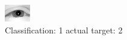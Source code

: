 \begin{figure}[h!]
\begin{center}
\includegraphics[width=0.60\columnwidth]{figures/ID2271_class_1_target_2.png}
\end{center}
\caption{ Classification: 1 actual target: 2}
\label{fig:ID2271_class_1_target_2}
\end{figure}
